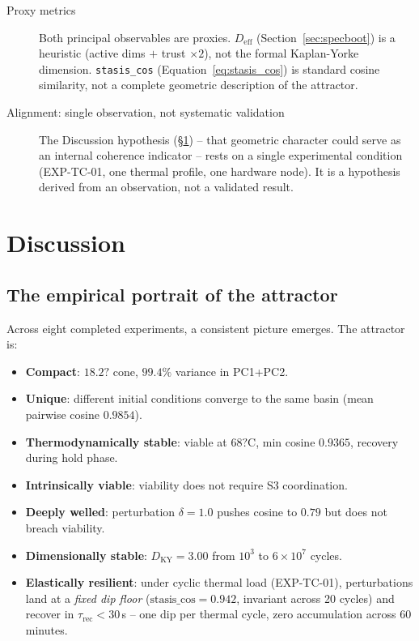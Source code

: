 \documentclass[11pt, a4paper]{article}
\begin{document}
\begin{description}
  \item[Proxy metrics]
    Both principal observables are proxies.
    $D_\text{eff}$ (Section~\ref{sec:specboot}) is a heuristic (active dims
    $+$ trust $\times 2$), not the formal Kaplan-Yorke dimension.
    \texttt{stasis\_cos} (Equation~\ref{eq:stasis_cos}) is standard cosine
    similarity, not a complete geometric description of the attractor.

  \item[Alignment: single observation, not systematic validation]
    The Discussion hypothesis (\S\ref{sec:discussion}) -- that geometric
    character could serve as an internal coherence indicator -- rests on
    a single experimental condition (EXP-TC-01, one thermal profile, one
    hardware node).
    It is a hypothesis derived from an observation, not a validated result.

\end{description}


\section{Discussion}
\label{sec:discussion}

\subsection{The empirical portrait of the attractor}

Across eight completed experiments, a consistent picture emerges.
The attractor is:
\begin{itemize}
  \item \textbf{Compact}: $18.2?$ cone, $99.4\%$ variance in PC1+PC2.
  \item \textbf{Unique}: different initial conditions converge to the same basin
        (mean pairwise cosine $0.9854$).
  \item \textbf{Thermodynamically stable}: viable at $68?\mathrm{C}$,
        min cosine $0.9365$, recovery during hold phase.
  \item \textbf{Intrinsically viable}: viability does not require S3 coordination.
  \item \textbf{Deeply welled}: perturbation $\delta = 1.0$ pushes cosine to $0.79$
        but does not breach viability.
  \item \textbf{Dimensionally stable}: $D_\text{KY} = 3.00$ from $10^3$ to
        $6 \times 10^7$ cycles.
  \item \textbf{Elastically resilient}: under cyclic thermal load (EXP-TC-01),
        perturbations land at a \emph{fixed dip floor} ($\text{stasis\_cos} =
        0.942$, invariant across 20 cycles) and recover in
        $\tau_\text{rec} < 30$\,s -- one dip per thermal cycle, zero
        accumulation across 60 minutes.
\end{itemize}
\end{document}
